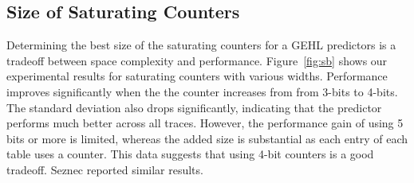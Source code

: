 \subsection{Size of Saturating Counters}
Determining the best size of the saturating counters for a GEHL predictors is a tradeoff between space complexity and performance. Figure~\ref{fig:sb} shows our experimental results for saturating counters with various widths. Performance improves significantly when the the counter increases from from 3-bits to 4-bits.  The standard deviation also drops significantly, indicating that the predictor performs much better across all traces.  However, the performance gain of using 5 bits or more is limited, whereas the added size is substantial as each entry of each table uses a counter.  This data suggests that using 4-bit counters is a good tradeoff.  Seznec reported similar results.


